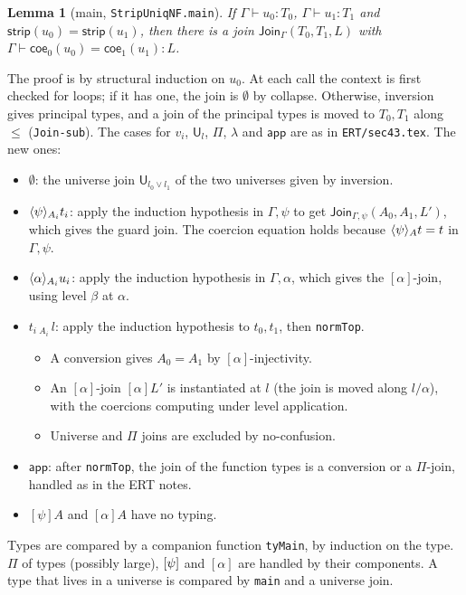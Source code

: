 \documentclass[10pt]{article}
\newcommand{\U}{\mathsf{U}}
\newcommand{\lam}{\lambda}
\newcommand{\app}{\mathsf{app}}
\newcommand{\strip}{\mathsf{strip}}
\newcommand{\coe}{\mathsf{coe}}
\newcommand{\Jn}{\mathsf{Join}}
\newcommand{\Emp}{\emptyset}
\newcommand{\grd}[2]{[#1]#2}
\newcommand{\glam}[2]{\langle #1\rangle #2}
\newcommand{\lpi}[1]{[\alpha]#1}
\newcommand{\llam}[1]{\langle\alpha\rangle #1}
\newcommand{\agda}[1]{\texttt{#1}}
\newtheorem{lemma}[theorem]{Lemma}
\theoremstyle{remark}
\begin{document}
\begin{lemma}[main, \agda{StripUniqNF.main}]
If $\Gamma\vdash u_0:T_0$, $\Gamma\vdash u_1:T_1$ and
$\strip(u_0)=\strip(u_1)$, then there is a join $\Jn_\Gamma(T_0,T_1,L)$
with $\Gamma\vdash\coe_0(u_0)=\coe_1(u_1):L$.
\end{lemma}
\noindent
The proof is by structural induction on $u_0$.  At each call the context is
first checked for loops; if it has one, the join is $\Emp$ by collapse.
Otherwise, inversion gives principal types, and a join of the principal
types is moved to $T_0,T_1$ along $\le$ (\agda{Join-sub}).  The cases for
$v_i$, $\U_l$, $\Pi$, $\lam$ and $\app$ are as in \texttt{ERT/sec43.tex}.
The new ones:
\begin{itemize}
\item $\Emp$: the universe join $\U_{l_0\vee l_1}$ of the two universes
  given by inversion.
\item $\glam\psi_{A_i}t_i$: apply the induction hypothesis in $\Gamma,\psi$
  to get $\Jn_{\Gamma,\psi}(A_0,A_1,L')$, which gives the guard join.  The
  coercion equation holds because $\glam\psi_{A}t=t$ in $\Gamma,\psi$.
\item $\llam_{A_i}u_i$: apply the induction hypothesis in $\Gamma,\alpha$,
  which gives the $[\alpha]$-join, using level $\beta$ at $\alpha$.
\item $t_i\,{}_{A_i}\,l$: apply the induction hypothesis to $t_0,t_1$, then
  \agda{normTop}.
  \begin{itemize}
  \item A conversion gives $A_0=A_1$ by $[\alpha]$-injectivity.
  \item An $[\alpha]$-join $\lpi{L'}$ is instantiated at $l$ (the join is
    moved along $l/\alpha$), with the coercions computing under level
    application.
  \item Universe and $\Pi$ joins are excluded by no-confusion.
  \end{itemize}
\item $\app$: after \agda{normTop}, the join of the function types is a
  conversion or a $\Pi$-join, handled as in the ERT notes.
\item $\grd\psi A$ and $\lpi A$ have no typing.
\end{itemize}
Types are compared by a companion function \agda{tyMain}, by induction on
the type.  $\Pi$ of types (possibly large), $\grd\psi$ and $[\alpha]$ are
handled by their components.  A type that lives in a universe is compared by
\agda{main} and a universe join.
\end{document}
